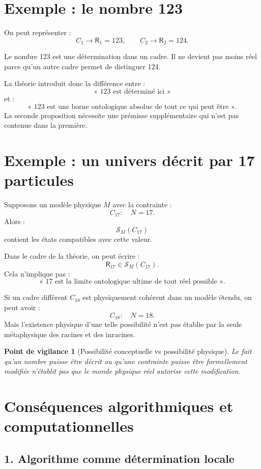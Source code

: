 \documentclass[11pt,a4paper]{article}
\newtheorem{warning}{Point de vigilance}[section]
\newcommand{\Rac}{\mathsf{R}}
\newcommand{\Sol}{\mathcal{S}}
\begin{document}
\section{Exemple : le nombre 123}

On peut représenter :
\[
C_1\to\Rac_1=123,
\qquad
C_2\to\Rac_2=124.
\]

Le nombre 123 est une détermination dans un cadre. Il ne devient pas moins
réel parce qu'un autre cadre permet de distinguer 124.

La théorie introduit donc la différence entre :
\[
\text{« 123 est déterminé ici »}
\]
et :
\[
\text{« 123 est une borne ontologique absolue de tout ce qui peut être ».}
\]
La seconde proposition nécessite une prémisse supplémentaire qui n'est pas
contenue dans la première.

\section{Exemple : un univers décrit par 17 particules}

Supposons un modèle physique \(M\) avec la contrainte :
\[
C_{17}:\quad N=17.
\]
Alors :
\[
\Sol_M(C_{17})
\]
contient les états compatibles avec cette valeur.

Dans le cadre de la théorie, on peut écrire :
\[
\Rac_{17}\in\Sol_M(C_{17}).
\]
Cela n'implique pas :
\[
\text{« 17 est la limite ontologique ultime de tout réel possible ».}
\]

Si un cadre différent \(C_{18}\) est physiquement cohérent dans un modèle
étendu, on peut avoir :
\[
C_{18}:\quad N=18.
\]
Mais l'existence physique d'une telle possibilité n'est pas établie par la
seule métaphysique des racines et des inracines.

\begin{warning}[Possibilité conceptuelle vs possibilité physique]
Le fait qu'un nombre puisse être décrit ou qu'une contrainte puisse être
formellement modifiée n'établit pas que le monde physique réel autorise cette
modification.
\end{warning}

\section{Conséquences algorithmiques et computationnelles}

\subsection{1. Algorithme comme détermination locale}
\end{document}
